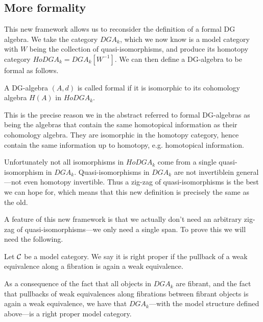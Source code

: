 \subsection{More formality}

This new framework allows us to reconsider the definition of a formal DG algebra. We take the category $DGA_k$, which we now know is a model category with $W$ being the collection of quasi-isomorphisms, and produce its homotopy category $HoDGA_k = DGA_k[W^{-1}]$. We can then define a DG-algebra to be formal as follows. 

\begin{definition}
\label{def:formal_dga2}
A DG-algebra $(A, d)$ is called formal if it is isomorphic to its cohomology algebra $H(A)$ in $HoDGA_k$.
\end{definition}

This is the precise reason we in the abstract referred to formal DG-algebras as being the algebras that contain the same homotopical information as their cohomology algebra. They are isomorphic in the homotopy category, hence contain the same information up to homotopy, e.g. homotopical information. 

Unfortunately not all isomorphisms in $HoDGA_k$ come from a single quasi-isomorphism in $DGA_k$. Quasi-isomorphisms in $DGA_k$ are not invertiblein general---not even homotopy invertible. Thus a zig-zag of quasi-isomorphisms is the best we can hope for, which means that this new definition is precisely the same as the old. 

A feature of this new framework is that we actually don't need an arbitrary zig-zag of quasi-isomorphisms---we only need a single span. To prove this we will need the following. 

\begin{definition}
\label{def:right_proper}
Let $\mathcal{C}$ be a model category. We say it is right proper if the pullback of a weak equivalence along a fibration is again a weak equivalence. 
\end{definition}

As a consequence of the fact that all objects in $DGA_k$ are fibrant, and the fact that pullbacks of weak equivalences along fibrations between fibrant objects is again a weak equivalence, we have that $DGA_k$---with the model structure defined above---is a right proper model category.  

